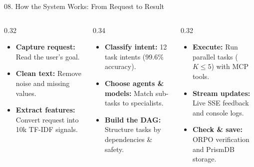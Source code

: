 \documentclass[aspectratio=169,10pt]{beamer}
\begin{document}
\begin{frame}[t]{08. How the System Works: From Request to Result}
\vspace{-0.46em}
\begin{columns}[T]
\begin{column}{0.32\textwidth}
  \begin{tcolorbox}[
    enhanced, arc=3pt, colframe=lavenderDark, colback=white,
    title={\scriptsize\bfseries Stage 1: Ingestion \& Features},
    boxrule=0.55pt, left=3.5pt, right=3.5pt, top=1.0pt, bottom=1.0pt
  ]
  \fontsize{5.8}{6.8}\selectfont
  \begin{itemize}\setlength{\itemsep}{0.8pt}
    \item \textbf{Capture request:} Read the user's goal.
    \item \textbf{Clean text:} Remove noise and missing values.
    \item \textbf{Extract features:} Convert request into 10k TF-IDF signals.
  \end{itemize}
  \end{tcolorbox}
\end{column}

\begin{column}{0.34\textwidth}
  \begin{tcolorbox}[
    enhanced, arc=3pt, colframe=prismTeal, colback=white,
    title={\scriptsize\bfseries Stage 2: Intelligence \& DAG},
    boxrule=0.55pt, left=3.5pt, right=3.5pt, top=1.0pt, bottom=1.0pt
  ]
  \fontsize{5.8}{6.8}\selectfont
  \begin{itemize}\setlength{\itemsep}{0.8pt}
    \item \textbf{Classify intent:} 12 task intents (99.6\% accuracy).
    \item \textbf{Choose agents \& models:} Match sub-tasks to specialists.
    \item \textbf{Build the DAG:} Structure tasks by dependencies \& safety.
  \end{itemize}
  \end{tcolorbox}
\end{column}

\begin{column}{0.32\textwidth}
  \begin{tcolorbox}[
    enhanced, arc=3pt, colframe=lavenderMedium, colback=white,
    title={\scriptsize\bfseries Stage 3: Execution \& Storage},
    boxrule=0.55pt, left=3.5pt, right=3.5pt, top=1.0pt, bottom=1.0pt
  ]
  \fontsize{5.8}{6.8}\selectfont
  \begin{itemize}\setlength{\itemsep}{0.8pt}
    \item \textbf{Execute:} Run parallel tasks ($K \le 5$) with MCP tools.
    \item \textbf{Stream updates:} Live SSE feedback and console logs.
    \item \textbf{Check \& save:} ORPO verification and PrismDB storage.
  \end{itemize}
  \end{tcolorbox}
\end{column}
\end{columns}


\end{frame}
\end{document}
